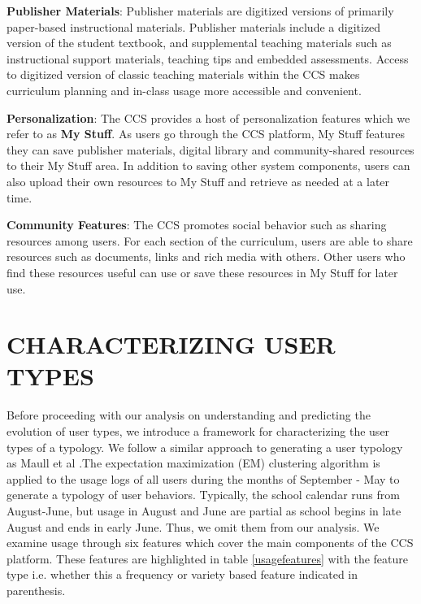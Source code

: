 \documentclass{acm_proc_article-sp}
\begin{document}
\textbf{Publisher Materials}:
Publisher materials are digitized versions of primarily paper-based instructional materials. Publisher materials include a digitized version of the student textbook, and supplemental teaching materials such as instructional support materials, teaching tips and embedded assessments. Access to digitized version of classic teaching materials within the CCS makes curriculum planning and in-class usage more accessible and convenient.

\textbf{Personalization}:
The CCS provides a host of personalization features which we refer to as \textbf{My Stuff}. As users go through the CCS platform, My Stuff features they can save publisher materials, digital library and community-shared resources to their My Stuff area. In addition to saving other system components, users can also upload their own resources to My Stuff and retrieve as needed at a later time.

\textbf{Community Features}:
The CCS promotes social behavior such as sharing resources among users. For each section of the curriculum, users are able to share resources such as documents, links and rich media with others. Other users who find these resources useful can use or save these resources in My Stuff for later use.

\section{CHARACTERIZING USER TYPES}\label{charusertypes}
Before proceeding with our analysis on understanding and predicting the evolution of user types, we introduce a framework for characterizing the user types of a typology. We follow a similar approach to generating a user typology as Maull et al \cite{maullunderstanding}.The expectation maximization (EM) clustering algorithm is applied to the usage logs of all users during the months of September - May to generate a typology of user behaviors. Typically, the school calendar runs from August-June, but usage in August and June are partial as school begins in late August and ends in early June. Thus, we omit them from our analysis. We examine usage through six  features which cover the main components of the CCS platform. These features are highlighted in table \ref{usagefeatures} with the feature type i.e. whether this a frequency or variety based feature indicated in parenthesis.
\end{document}
